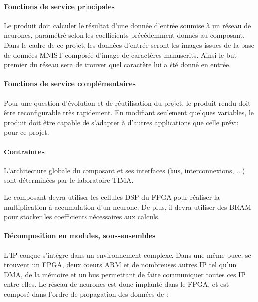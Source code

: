 \paragraph{Fonctions de service principales\\}

Le produit doit calculer le résultat d'une donnée d'entrée soumise à un réseau
de neurones, paramétré selon les coefficients précédemment donnés au composant.
Dans le cadre de ce projet, les données d'entrée seront les images issues de la base de données MNIST composée d'image de caractères manuscrits.
Ainsi le but premier du réseau sera de trouver quel caractère lui a été donné en entrée.

\paragraph{Fonctions de service complémentaires\\}
Pour une question d'évolution et de réutilisation du projet, le produit rendu doit être reconfigurable très rapidement.
En modifiant seulement quelques variables, le produit doit être capable de s'adapter à d'autres applications que celle prévu pour ce projet.

\paragraph{Contraintes\\}

L'architecture globale du composant et ses interfaces (bus, interconnexions, ...) sont déterminées
par le laboratoire TIMA.

Le composant devra utiliser les cellules DSP du FPGA pour réaliser la multiplication à accumulation
d'un neurone. De plus, il devra utiliser des BRAM pour stocker les coefficients nécessaires aux calculs.

\paragraph{Décomposition en modules, sous-ensembles\\}

L'IP conçue s'intègre dans un environnement complexe.
Dans une même puce, se trouvent un FPGA, deux coeurs ARM et de nombreuses autres IP tel qu'un DMA,
de la mémoire et un bus permettant de faire communiquer toutes ces IP entre elles.
Le réseau de neurones est donc implanté dans le FPGA, et est composé dans l'ordre de propagation des données de :

